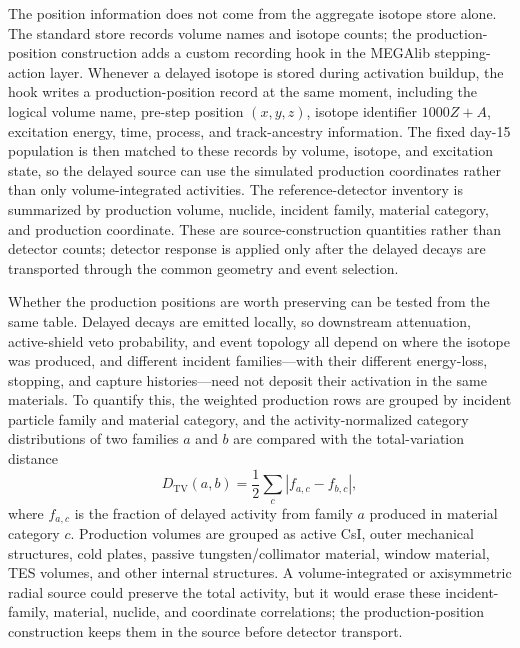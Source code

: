 \documentclass[11pt]{article}
\begin{document}
The position information does not come from the aggregate isotope store alone.
The standard store records volume names and isotope counts; the
production-position construction adds a custom recording hook in the MEGAlib
stepping-action layer. Whenever a delayed isotope is stored during activation
buildup, the hook writes a production-position record at the same moment,
including the logical volume name, pre-step position $(x,y,z)$, isotope
identifier $1000Z+A$, excitation energy, time, process, and track-ancestry
information. The fixed day-15 population is then matched to these records by
volume, isotope, and excitation state, so the delayed source can use the
simulated production coordinates rather than only volume-integrated activities.
The reference-detector inventory is summarized by production volume, nuclide,
incident family, material category, and production coordinate. These are
source-construction quantities rather than detector counts; detector response is
applied only after the delayed decays are transported through the common geometry
and event selection.

Whether the production positions are worth preserving can be tested from the
same table. Delayed decays are emitted locally, so downstream attenuation,
active-shield veto probability, and event topology all depend on where the
isotope was produced, and different incident families---with their different
energy-loss, stopping, and capture histories---need not deposit their
activation in the same materials. To quantify this, the weighted production
rows are grouped by incident particle family and material category, and the
activity-normalized category distributions of two families $a$ and $b$ are
compared with the total-variation distance
\begin{equation}
  D_{\mathrm{TV}}(a,b) =
  \frac{1}{2}\sum_c \left| f_{a,c} - f_{b,c} \right| ,
\end{equation}
where $f_{a,c}$ is the fraction of delayed activity from family $a$ produced
in material category $c$. Production volumes are grouped as active CsI,
outer mechanical structures, cold plates, passive tungsten/collimator material,
window material, TES volumes, and other internal structures. A volume-integrated
or axisymmetric radial source could preserve the total
activity, but it would erase these incident-family, material, nuclide, and
coordinate correlations; the production-position construction keeps them in
the source before detector transport.
\end{document}
